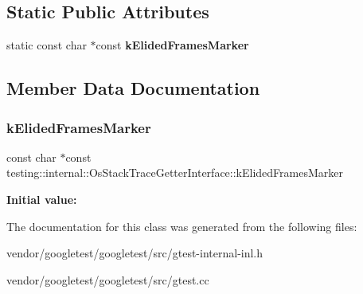 \subsection*{Static Public Attributes}
\begin{DoxyCompactItemize}
\item 
static const char $\ast$const {\bfseries k\+Elided\+Frames\+Marker}
\end{DoxyCompactItemize}


\subsection{Member Data Documentation}
\mbox{\label{classtesting_1_1internal_1_1_os_stack_trace_getter_interface_a669c49ce9ae05935e70bddb35a81ceb8}} 
\subsubsection{\texorpdfstring{k\+Elided\+Frames\+Marker}{kElidedFramesMarker}}
{\footnotesize\ttfamily const char $\ast$const testing\+::internal\+::\+Os\+Stack\+Trace\+Getter\+Interface\+::k\+Elided\+Frames\+Marker\hspace{0.3cm}{\ttfamily [static]}}

{\bfseries Initial value\+:}
\begin{DoxyCode}{0}
\DoxyCodeLine{=}
\end{DoxyCode}


The documentation for this class was generated from the following files\+:\begin{DoxyCompactItemize}
\item 
vendor/googletest/googletest/src/gtest-\/internal-\/inl.\+h\item 
vendor/googletest/googletest/src/gtest.\+cc\end{DoxyCompactItemize}
